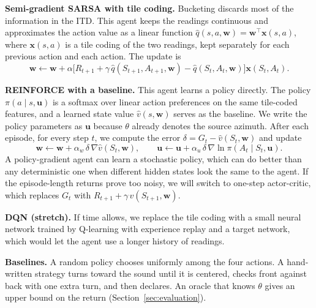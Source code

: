\documentclass{article}
\begin{document}
\textbf{Semi-gradient SARSA with tile coding.} Bucketing discards most of the
information in the ITD. This agent keeps the readings continuous and
approximates the action value as a linear function
$\hat q(s, a, \mathbf{w}) = \mathbf{w}^{\top} \mathbf{x}(s, a)$, where
$\mathbf{x}(s, a)$ is a tile coding of the two readings, kept separately for
each previous action and each action. The update is
\begin{equation}
  \mathbf{w} \leftarrow \mathbf{w} + \alpha \bigl[ R_{t+1} +
  \gamma\, \hat q(S_{t+1}, A_{t+1}, \mathbf{w}) - \hat q(S_t, A_t, \mathbf{w})
  \bigr] \mathbf{x}(S_t, A_t).
\end{equation}

\textbf{REINFORCE with a baseline.} This agent learns a policy directly. The
policy $\pi(a \mid s, \mathbf{u})$ is a softmax over linear action preferences
on the same tile-coded features, and a learned state value
$\hat v(s, \mathbf{w})$ serves as the baseline. We write the policy
parameters as $\mathbf{u}$ because $\theta$ already denotes the source
azimuth. After each episode, for every step $t$, we compute the error
$\delta = G_t - \hat v(S_t, \mathbf{w})$ and update
\begin{equation}
  \mathbf{w} \leftarrow \mathbf{w} + \alpha_{w}\, \delta\,
  \nabla \hat v(S_t, \mathbf{w}), \qquad
  \mathbf{u} \leftarrow \mathbf{u} + \alpha_{u}\, \delta\,
  \nabla \ln \pi(A_t \mid S_t, \mathbf{u}).
\end{equation}
A policy-gradient agent can learn a stochastic policy, which can do better
than any deterministic one when different hidden states look the same to the
agent. If the episode-length returns prove too noisy, we will switch to
one-step actor-critic, which replaces $G_t$ with
$R_{t+1} + \gamma\, \hat v(S_{t+1}, \mathbf{w})$.

\textbf{DQN (stretch).} If time allows, we replace the tile coding with a
small neural network trained by Q-learning with experience replay and a target
network, which would let the agent use a longer history of readings.

\textbf{Baselines.} A random policy chooses uniformly among the four actions.
A hand-written strategy turns toward the sound until it is centered, checks
front against back with one extra turn, and then declares. An oracle that
knows $\theta$ gives an upper bound on the return
(Section~\ref{sec:evaluation}).


\end{document}
